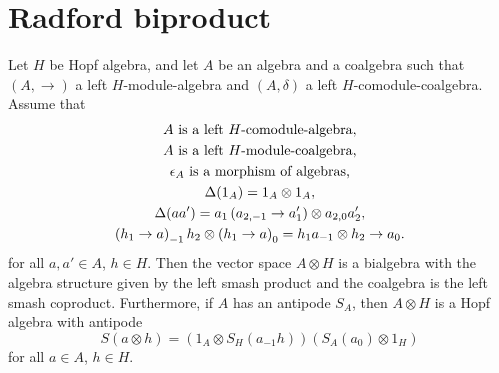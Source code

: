 \documentclass[12pt]{amsproc}
\begin{document}


\section{Radford biproduct}


\begin{theorem}[Radford]
\label{theorem:radford}
Let $H$ be Hopf algebra, and let $A$ be an algebra and a coalgebra such that
$(A,\rightarrow)$ a left $H$-module-algebra and $(A,\delta)$ a left
$H$-comodule-coalgebra.  Assume that 
\begin{gather}
A\text{ is a left \ensuremath{H}-comodule-algebra},\label{eq:radford_1}\\
A\text{ is a left \ensuremath{H}-module-coalgebra,}\label{eq:radford_2}\\
\epsilon_{A}\text{ is a morphism of algebras,}\label{eq:radford_3}\\
\Delta(1_{A})=1_{A}\otimes1_{A},\label{eq:radford_4}\\
\Delta(aa')=a_{1}\left(a_{2,-1}\rightarrow a'_{1}\right)\otimes a_{2,0}a'_{2},\label{eq:radford_5}\\
\left(h_{1}\rightarrow a\right)_{-1}h_{2}\otimes\left(h_{1}\rightarrow a\right)_{0}=h_{1}a_{-1}\otimes h_{2}\rightarrow a_{0}.\label{eq:radford_6}
\end{gather}
for all $a,a'\in A$, $h\in H$.
Then the vector space $A\otimes H$ is a bialgebra with the algebra structure
given by the left smash product and the coalgebra is the left smash coproduct.
Furthermore, if $A$ has an antipode $S_A$, then $A\otimes H$ is a Hopf algebra
with antipode
\[
S(a\otimes h)=(1_A\otimes S_{H}(a_{-1}h))(S_{A}(a_{0})\otimes1_H)
\]
for all $a\in A$, $h\in H$.
\end{theorem}
\end{document}
